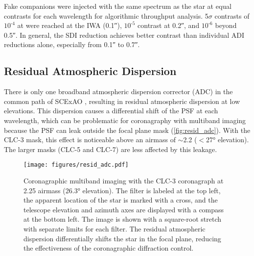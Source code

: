 Fake companions were injected with the same spectrum as the star at equal contrasts for each wavelength for algorithmic throughput analysis. 5$\sigma$ contrasts of $10^{\text{-}4}$ at were reached at the IWA (\ang{;;0.1}), $10^{\text{-}5}$ contrast at \ang{;;0.2}, and $10^{\text{-}6}$ beyond \ang{;;0.5}. In general, the SDI reduction achieves better contrast than individual ADI reductions alone, especially from \ang{;;0.1} to \ang{;;0.7}.

\subsection{Residual Atmospheric Dispersion}

There is only one broadband atmospheric dispersion corrector (ADC) in the common path of SCExAO \citep{egner_atmospheric_2010}, resulting in residual atmospheric dispersion at low elevations. This dispersion causes a differential shift of the PSF at each wavelength, which can be problematic for coronagraphy with multiband imaging because the PSF can leak outside the focal plane mask (\autoref{fig:resid_adc}). With the CLC-3 mask, this effect is noticeable above an airmass of $\sim$\num{2.2} ($<$\ang{27} elevation). The larger masks (CLC-5 and CLC-7) are less affected by this leakage.

\begin{figure}
    \centering
    \texttt{[image: figures/resid\_adc.pdf]}
    \caption{Coronagraphic multiband imaging with the CLC-3 coronagraph at 2.25 airmass (\ang{26.3} elevation). The filter is labeled at the top left, the apparent location of the star is marked with a cross, and the telescope elevation and azimuth axes are displayed with a compass at the bottom left. The image is shown with a square-root stretch with separate limits for each filter. The residual atmospheric dispersion differentially shifts the star in the focal plane, reducing the effectiveness of the coronagraphic diffraction control.\label{fig:resid_adc}}
\end{figure}
